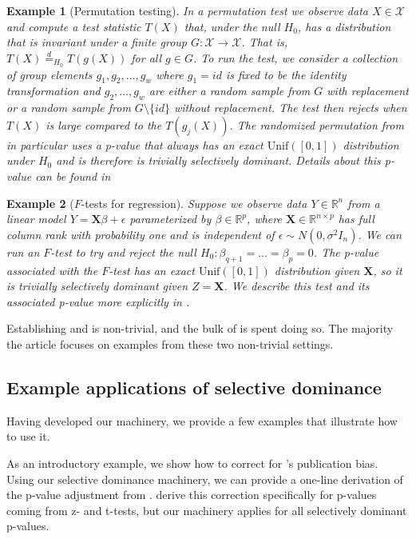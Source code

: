 \documentclass{article}
\newtheorem{example}{Example}
\newcommand{\R}{\mathbb{R}}
\newcommand{\X}{\boldsymbol{X}}
\begin{document}
\begin{example}[Permutation testing]
In a permutation test we observe data $X \in \mathcal{X}$ and compute a test statistic $T(X)$ that, under the null $H_0$, has a distribution that is invariant under a finite group $G : \mathcal{X} \rightarrow \mathcal{X}$. That is, $T(X) \overset{d}{=}_{H_0} T(g(X))$ for all $ g \in G$. To run the test, we consider a collection of group elements $g_1, g_2, \dots, g_w$ where $g_1 = id$ is fixed to be the identity transformation and $g_2, \dots, g_w$ are either a random sample from $G$ with replacement or a random sample from $G \setminus \{id \}$ without replacement. The test then rejects when $T(X)$ is large compared to the $T(g_j(X))$. The randomized permutation from \cite{Hemerik} in particular uses a p-value that always has an exact $\text{Unif}([0, 1])$ distribution under $H_0$ and is therefore is trivially selectively dominant. Details about this p-value can be found in 
\end{example}

\begin{example}[$F$-tests for regression]
Suppose we observe data $Y \in \R^n$ from a linear model $Y = \X \beta + \epsilon$ parameterized by $\beta \in \R^p$,  where $\X \in \R^{n \times p }$ has full column rank with probability one and is independent of $\epsilon \sim N(0, \sigma^2 I_n)$. We can run an $F$-test to try and reject the null $H_0 : \beta_{q+1} = \dots = \beta_p = 0$. The p-value associated with the $F$-test has an exact $\text{Unif}([0, 1])$ distribution given $\X$, so it is trivially selectively dominant given $Z = \X$. We describe this test and its associated p-value more explicitly in . 
\end{example}

Establishing  and  is non-trivial, and the bulk of  is spent doing so. The majority the article focuses on examples from these two non-trivial settings. 

\subsection{Example applications of selective dominance}

Having developed our machinery, we provide a few examples that illustrate how to use it.

As an introductory example, we show how to correct for 's publication bias. Using our selective dominance machinery, we can provide a one-line derivation of the p-value adjustment from \cite{Hung2020}. \cite{Hung2020} derive this correction specifically for p-values coming from z- and t-tests, but our machinery applies for all selectively dominant p-values. 
\end{document}
